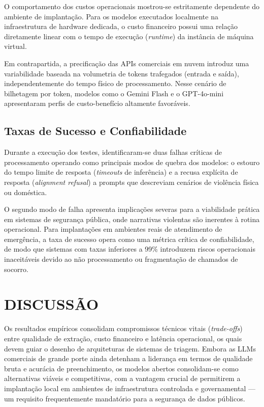 \documentclass{IEEEphot}
\begin{document}
O comportamento dos custos operacionais mostrou-se estritamente dependente do ambiente de implantação. Para os modelos executados localmente na infraestrutura de hardware dedicada, o custo financeiro possui uma relação diretamente linear com o tempo de execução (\textit{runtime}) da instância de máquina virtual.

Em contrapartida, a precificação das APIs comerciais em nuvem introduz uma variabilidade baseada na volumetria de tokens trafegados (entrada e saída), independentemente do tempo físico de processamento. Nesse cenário de bilhetagem por token, modelos como o Gemini Flash e o GPT-4o-mini apresentaram perfis de custo-benefício altamente favoráveis.

\subsection{Taxas de Sucesso e Confiabilidade}

Durante a execução dos testes, identificaram-se duas falhas críticas de processamento operando como principais modos de quebra dos modelos: o estouro do tempo limite de resposta (\textit{timeouts} de inferência) e a recusa explícita de resposta (\textit{alignment refusal}) a prompts que descreviam cenários de violência física ou doméstica. 

O segundo modo de falha apresenta implicações severas para a viabilidade prática em sistemas de segurança pública, onde narrativas violentas são inerentes à rotina operacional. Para implantações em ambientes reais de atendimento de emergência, a taxa de sucesso opera como uma métrica crítica de confiabilidade, de modo que sistemas com taxas inferiores a 99\% introduzem riscos operacionais inaceitáveis devido ao não processamento ou fragmentação de chamados de socorro.

\section{DISCUSSÃO}


Os resultados empíricos consolidam compromissos técnicos vitais (\textit{trade-offs}) entre qualidade de extração, custo financeiro e latência operacional, os quais devem guiar o desenho de arquiteturas de sistemas de triagem. Embora as LLMs comerciais de grande porte ainda detenham a liderança em termos de qualidade bruta e acurácia de preenchimento, os modelos abertos consolidam-se como alternativas viáveis e competitivas, com a vantagem crucial de permitirem a implantação local em ambientes de infraestrutura controlada e governamental — um requisito frequentemente mandatório para a segurança de dados públicos.
\end{document}
